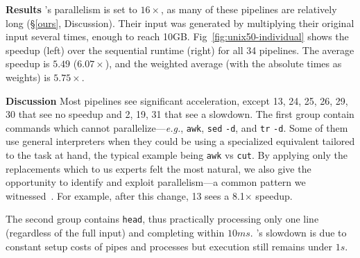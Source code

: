 \documentclass[letterpaper,twocolumn,10pt]{article}
\newcommand{\eg}{{\em e.g.}, }
\newcommand{\heading}[1]{\vspace{4pt}\noindent\textbf{#1}\enspace}
\newcommand{\ttt}[1]{\texttt{#1}}
\newcommand{\TODO}[1]{\hl{\textbf{TODO:} #1}\xspace}
\newcommand{\todo}[1]{\hl{#1}\xspace}
\newcommand{\kk}[1]{[{\color{magenta}kk: #1}]}
\begin{document}
\heading{Results}
\sys's parallelism is set to $16\times$, as many of these pipelines are relatively long (\S\ref{ours}, Discussion).
Their input was generated by multiplying their original input several times, enough to reach 10GB.
Fig~\ref{fig:unix50-individual} shows the speedup (left) over the sequential runtime (right) for all 34 pipelines.
The average speedup is $5.49$ ($6.07\times$), and the weighted average (with the absolute times as weights) is $5.75\times$.



\heading{Discussion}
Most pipelines see significant acceleration, except 13, 24, 25, 26, 29, 30 that see no speedup and 2, 19, 31 that see a slowdown.
The first group contain commands which \sys cannot parallelize---\eg \ttt{awk}, \ttt{sed} \ttt{-d}, and \ttt{tr} \ttt{-d}.
Some of them use general interpreters when they could be using a specialized equivalent tailored to the task at hand, the typical example being \ttt{awk} vs \ttt{cut}.
By applying only the replacements which to us experts felt the most natural, we also give \sys the opportunity to identify and exploit parallelism---a common pattern we witnessed~.
For example, after this change, 13 sees a 8.1$\times$ speedup.

The second group contains \ttt{head}, thus practically processing only one line (regardless of the full input) and completing within $10ms$.
\sys's slowdown is due to constant setup costs of pipes and processes but execution still remains under $1s$.

% 
% 
% 
\end{document}
